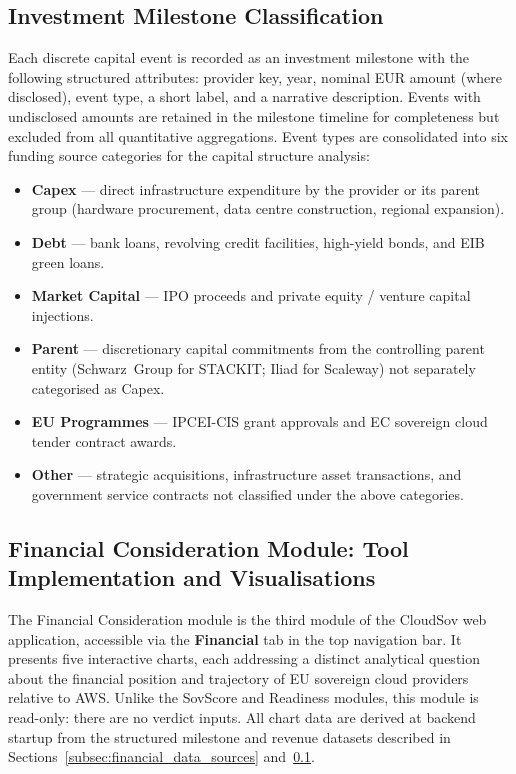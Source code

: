 \subsection{Investment Milestone Classification}
\label{subsec:milestone_classification}

Each discrete capital event is recorded as an investment milestone with the following structured attributes: provider key, year, nominal EUR amount (where disclosed), event type, a short label, and a narrative description. Events with undisclosed amounts are retained in the milestone timeline for completeness but excluded from all quantitative aggregations. Event types are consolidated into six funding source categories for the capital structure analysis:

\begin{itemize}
  \item \textbf{Capex} --- direct infrastructure expenditure by the provider or its parent group (hardware procurement, data centre construction, regional expansion).
  \item \textbf{Debt} --- bank loans, revolving credit facilities, high-yield bonds, and EIB green loans.
  \item \textbf{Market Capital} --- IPO proceeds and private equity / venture capital injections.
  \item \textbf{Parent} --- discretionary capital commitments from the controlling parent entity (Schwarz~Group for STACKIT; Iliad for Scaleway) not separately categorised as Capex.
  \item \textbf{EU Programmes} --- IPCEI-CIS grant approvals and EC sovereign cloud tender contract awards.
  \item \textbf{Other} --- strategic acquisitions, infrastructure asset transactions, and government service contracts not classified under the above categories.
\end{itemize}

\subsection{Financial Consideration Module: Tool Implementation and Visualisations}
\label{subsec:financial_tool}

The Financial Consideration module is the third module of the CloudSov web application, accessible via the \textbf{Financial} tab in the top navigation bar. It presents five interactive charts, each addressing a distinct analytical question about the financial position and trajectory of EU sovereign cloud providers relative to AWS. Unlike the SovScore and Readiness modules, this module is read-only: there are no verdict inputs. All chart data are derived at backend startup from the structured milestone and revenue datasets described in Sections~\ref{subsec:financial_data_sources} and~\ref{subsec:milestone_classification}.

